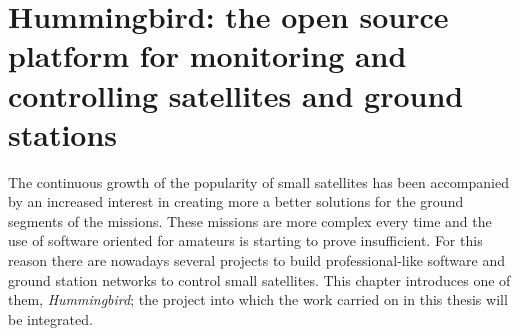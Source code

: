 
\chapter{Hummingbird: the open source platform for monitoring and controlling satellites and ground stations}\label{chapter3}

The continuous growth of the popularity of small satellites has been accompanied by an increased interest in creating more a better solutions for the ground segments of the missions. These missions are more complex every time and the use of software oriented for amateurs is starting to prove insufficient. For this reason there are nowadays several projects to build professional-like software and ground station networks to control small satellites. This chapter introduces one of them, \emph{Hummingbird}; the project into which the work carried on in this thesis will be integrated. 

\

\newpage